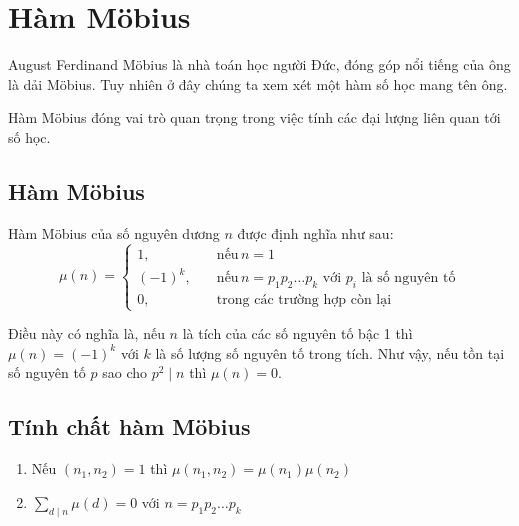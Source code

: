 \section{Hàm Möbius}

August Ferdinand Möbius là nhà toán học người Đức, đóng góp nổi tiếng của ông là dải Möbius. Tuy nhiên ở đây chúng ta xem xét một hàm số học mang tên ông. 

Hàm Möbius đóng vai trò quan trọng trong việc tính các đại lượng liên quan tới số học.

\subsection*{Hàm Möbius}

\begin{definition}
    Hàm Möbius của số nguyên dương $n$ được định nghĩa như sau:
    \begin{equation}
        \mu (n) = \begin{cases}
            1, \quad & \text{nếu}\, n = 1 \\
            (-1)^k, \quad & \text{nếu}\, n = p_1 p_2 \ldots p_k  \text{ với } p_i \text{ là số nguyên tố} \\
            0, \quad & \text{trong các trường hợp còn lại}
        \end{cases}
    \end{equation}
\end{definition}

Điều này có nghĩa là, nếu $n$ là tích của các số nguyên tố bậc 1 thì $\mu (n) = (-1)^k$ với $k$ là số lượng số nguyên tố trong tích. Như vậy, nếu tồn tại số nguyên tố $p$ sao cho $p^2 \mid n$ thì $\mu(n) = 0$.

\subsection*{Tính chất hàm Möbius}

\begin{enumerate}
    \item Nếu $(n_1, n_2) = 1$ thì $\mu(n_1, n_2) = \mu(n_1) \mu(n_2)$
    \item $\displaystyle{\sum_{d \mid n} \mu(d) = 0}$ với $n = p_1 p_2 \ldots p_k$
\end{enumerate}

